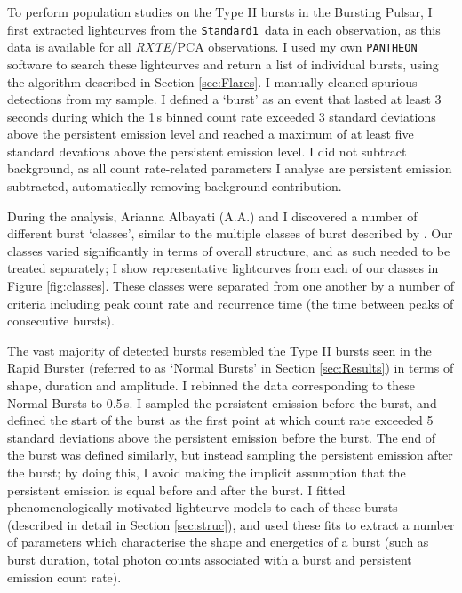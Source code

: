 \par To perform population studies on the Type II bursts in the Bursting Pulsar, I first extracted lightcurves from the \texttt{Standard1}\indexsto\ data in each observation, as this data is available for all \indexpca\textit{RXTE}/PCA observations.  I used my own \texttt{PANTHEON} software to search these lightcurves and return a list of individual bursts, using the algorithm described in Section \ref{sec:Flares}.  I manually cleaned spurious detections from my sample.  I defined a `burst' as an event that lasted at least 3 seconds during which the 1\,s binned count rate exceeded 3 standard deviations above the persistent emission level and reached a maximum of at least five standard devations above the persistent emission level.  I did not subtract background, as all count rate-related parameters I analyse are persistent emission subtracted, automatically removing background contribution.
\par During the analysis, Arianna Albayati (\textsf{A.A.}) and I discovered a number of different burst `classes', similar to the multiple classes of burst described by \citet{Giles_BP}.  Our classes varied significantly in terms of overall structure, and as such needed to be treated separately; I show representative lightcurves from each of our classes in Figure \ref{fig:classes}.  These classes were separated from one another by a number of criteria including peak count rate and recurrence time (the time between peaks of consecutive bursts).
\par The vast majority of detected bursts resembled the Type II bursts seen in the Rapid Burster (referred to as `Normal Bursts' in Section \ref{sec:Results}) in terms of shape, duration and amplitude.  I rebinned the data corresponding to these Normal Bursts to 0.5\,s.  I sampled the persistent emission before the burst, and defined the start of the burst as the first point at which count rate exceeded 5 standard deviations above the persistent emission before the burst.  The end of the burst was defined similarly, but instead sampling the persistent emission after the burst; by doing this, I avoid making the implicit assumption that the persistent emission is equal before and after the burst.  I fitted phenomenologically-motivated lightcurve models to each of these bursts (described in detail in Section \ref{sec:struc}), and used these fits to extract a number of parameters which characterise the shape and energetics of a burst (such as burst duration, total photon counts associated with a burst and persistent emission count rate).
